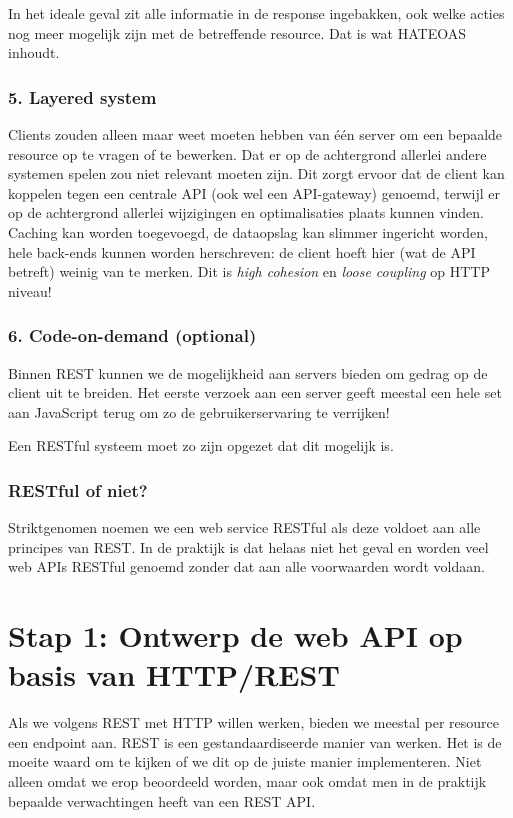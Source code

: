 In het ideale geval zit alle informatie in de response ingebakken,
ook welke acties nog meer mogelijk zijn met de betreffende resource.
Dat is wat HATEOAS inhoudt.

\subsubsection{5. Layered system}
Clients zouden alleen maar weet moeten hebben van één server 
om een bepaalde resource op te vragen of te bewerken. Dat er 
op de achtergrond allerlei andere systemen spelen zou niet relevant 
moeten zijn. Dit zorgt ervoor dat de client kan koppelen tegen 
een centrale API (ook wel een API-gateway) genoemd, terwijl er op 
de achtergrond allerlei wijzigingen en optimalisaties plaats kunnen
vinden. Caching kan worden toegevoegd, de dataopslag kan slimmer 
ingericht worden, hele back-ends kunnen worden herschreven: de client 
hoeft hier (wat de API betreft) weinig van te merken.
Dit is \textit{high cohesion} 
en \textit{loose coupling} op HTTP niveau!

\subsubsection{6. Code-on-demand (optional)}
Binnen REST kunnen we de mogelijkheid aan servers bieden om gedrag 
op de client uit te breiden. Het eerste verzoek aan een server geeft 
meestal een hele set aan JavaScript terug om zo de gebruikerservaring 
te verrijken!

Een RESTful systeem moet zo zijn opgezet dat dit mogelijk is.

\subsubsection{RESTful of niet?}
Striktgenomen noemen we een web service RESTful als deze voldoet aan 
alle principes van REST. In de praktijk is dat helaas niet het geval
en worden veel web APIs RESTful genoemd zonder dat aan alle voorwaarden 
wordt voldaan.

\section{Stap 1: Ontwerp de web API op basis van HTTP/REST}
Als we volgens REST met HTTP willen werken, bieden we meestal per resource een endpoint aan. 
REST is een gestandaardiseerde manier van werken. 
Het is de moeite waard om te kijken of we dit op de juiste manier implementeren. 
Niet alleen omdat we erop beoordeeld worden, maar ook omdat men in de praktijk bepaalde verwachtingen heeft van een REST API.

